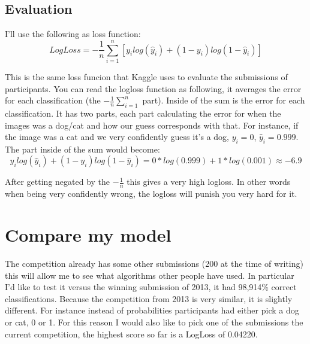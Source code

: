 \documentclass[11pt]{article}
\begin{document}
\subsection{Evaluation} 
I'll use the following as loss function: 
\[ LogLoss = -\dfrac{1}{n}\sum\limits^{n}_{i=1}[y_i log(\hat{y}_i) + (1-y_i)log(1-\hat{y}_i)]
\]

This is the same loss funcion that Kaggle uses to evaluate the submissions of participants. You can read the logloss function as following, it averages the error for each classification (the $-\frac{1}{n}\sum\limits^{n}_{i=1}$ part). Inside of the sum is the error for each classification. It has two parts, each part calculating the error for when the images was a dog/cat and how our guess corresponds with that. For instance, if the image was a cat and we very confidently guess it's a dog, $y_i = 0$, $\hat{y}_i = 0.999$. The part inside of the sum would become: 
\[
y_i log(\hat{y}_i) + (1-y_i)log(1-\hat{y}_i) = 0 * log(0.999) + 1 * log(0.001) \approx -6.9
\]

After getting negated by the $-\frac{1}{n}$ this gives a very high logloss.
In other words when being very confidently wrong, the logloss will punish you very hard for it.
\section{Compare my model}
The competition already has some other submissions (200 at the time of writing) this will allow me to see what algorithms other people have used. In particular I'd like to test it versus the winning submission of 2013, it had 98,914\% correct classifications. Because the competition from 2013 is very similar, it is slightly different. For instance instead of probabilities participants had either pick a dog or cat, 0 or 1. For this reason I would also like to pick one of the submissions the current competition, the highest score so far is a LogLoss of 0.04220.
\end{document}
